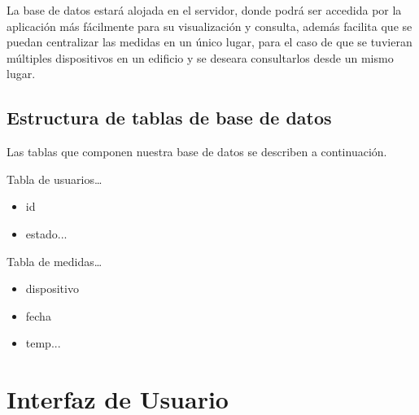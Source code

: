 La base de datos estará alojada en el servidor, donde podrá ser accedida por la aplicación más fácilmente para su visualización y consulta, además facilita que se puedan centralizar las medidas en un único lugar, para el caso de que se tuvieran múltiples dispositivos en un edificio y se deseara consultarlos desde un mismo lugar.

\subsection{Estructura de tablas de base de datos}
Las tablas que componen nuestra base de datos se describen a continuación.

Tabla de usuarios\dots
\begin{itemize}
    \item id
    \item estado...
\end{itemize}


Tabla de medidas\dots
\begin{itemize}
    \item dispositivo
    \item fecha
    \item temp...
\end{itemize}

\section{Interfaz de Usuario}\label{sec:interfaz}